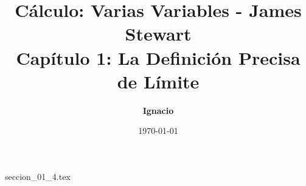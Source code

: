 \documentclass[11pt,spanish,oneside]{report}
\title{\textbf{Cálculo: Varias Variables - James Stewart} \\ \Large Capítulo 1: La Definición Precisa de Límite}
\author{\textbf{Ignacio}}
\date{\today}
\begin{document}
\maketitle

{seccion_01_4.tex}
\end{document}
